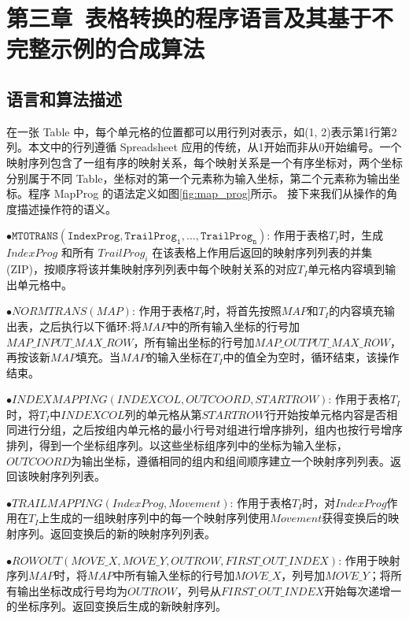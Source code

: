 \documentclass[design, pageheader]{njubachelor}
\begin{document}
\section{第三章~表格转换的程序语言及其基于不完整示例的合成算法}
\subsection{语言和算法描述}
在一张 Table 中，每个单元格的位置都可以用行列对表示，如(1, 2)表示第1行第2列。本文中的行列遵循 Spreadsheet 应用的传统，从1开始而非从0开始编号。一个映射序列包含了一组有序的映射关系，每个映射关系是一个有序坐标对，两个坐标分别属于不同 Table，坐标对的第一个元素称为输入坐标，第二个元素称为输出坐标。程序 MapProg 的语法定义如图\ref{fig:map_prog}所示。 接下来我们从操作的角度描述操作符的语义。

\begin{ttmath}
$\bullet \mathtt{MTOTRANS(IndexProg,{TrailProg_{1},...,TrailProg_{n}})}$: 作用于表格$T_{I}$时，生成 $IndexProg$ 和所有 ${TrailProg_{i}}$ 在该表格上作用后返回的映射序列列表的并集(ZIP)，按顺序将该并集映射序列列表中每个映射关系的对应$T_{I}$单元格内容填到输出单元格中。

$\bullet NORMTRANS(MAP)$: 作用于表格$T_{I}$时，将首先按照$MAP$和$T_{I}$的内容填充输出表，之后执行以下循环:将$MAP$中的所有输入坐标的行号加$MAP\_INPUT\_MAX\_ROW$，所有输出坐标的行号加$MAP\_OUTPUT\_MAX\_ROW$，再按该新$MAP$填充。当$MAP$的输入坐标在$T_{I}$中的值全为空时，循环结束，该操作结束。

$\bullet INDEXMAPPING(INDEXCOL, OUTCOORD, STARTROW)$: 作用于表格$T_{I}$时，将$T_{I}$中$INDEXCOL$列的单元格从第$STARTROW$行开始按单元格内容是否相同进行分组，之后按组内单元格的最小行号对组进行增序排列，组内也按行号增序排列，得到一个坐标组序列。以这些坐标组序列中的坐标为输入坐标，$OUTCOORD$为输出坐标，遵循相同的组内和组间顺序建立一个映射序列列表。返回该映射序列列表。

$\bullet TRAILMAPPING(IndexProg, Movement)$: 作用于表格$T_{I}$时，对$IndexProg$作用在$T_{I}$上生成的一组映射序列中的每一个映射序列使用$Movement$获得变换后的映射序列。返回变换后的新的映射序列列表。

$\bullet ROWOUT(MOVE\_X, MOVE\_Y, OUTROW, FIRST\_OUT\_INDEX)$: 作用于映射序列$MAP$时，将$MAP$中所有输入坐标的行号加$MOVE\_X$，列号加$MOVE\_Y$；将所有输出坐标改成行号均为$OUTROW$，列号从$FIRST\_OUT\_INDEX$开始每次递增一的坐标序列。返回变换后生成的新映射序列。
\end{ttmath}
\end{document}
